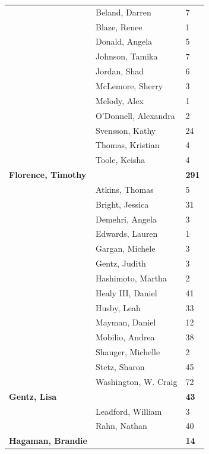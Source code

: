 \documentclass{article}\usepackage[]{graphicx}\usepackage[]{color}
\begin{document}
{\begin{longtable} { >{\raggedright}p{}|p{}p{}}
   & Beland, Darren & 7 \\ 
   & Blaze, Renee & 1 \\ 
   & Donald, Angela & 5 \\ 
   \rowcolor[gray]{0.90} & Johnson, Tamika & 7 \\ 
   \rowcolor[gray]{0.90} & Jordan, Shad & 6 \\ 
   \rowcolor[gray]{0.90} & McLemore, Sherry & 3 \\ 
   & Melody, Alex & 1 \\ 
   & O'Donnell, Alexandra & 2 \\ 
   & Svensson, Kathy & 24 \\ 
   \rowcolor[gray]{0.90} & Thomas, Kristian & 4 \\ 
   \rowcolor[gray]{0.90} & Toole, Keisha & 4 \\ 
   \rowcolor[gray]{0.90}\textbf{Florence, Timothy} &  & \hspace{2cm}\textbf{291} \\ 
   & Atkins, Thomas & 5 \\ 
   & Bright, Jessica & 31 \\ 
   & Demehri, Angela & 3 \\ 
   \rowcolor[gray]{0.90} & Edwards, Lauren & 1 \\ 
   \rowcolor[gray]{0.90} & Gargan, Michele & 3 \\ 
   \rowcolor[gray]{0.90} & Gentz, Judith & 3 \\ 
   & Hashimoto, Martha & 2 \\ 
   & Healy III, Daniel & 41 \\ 
   & Husby, Leah & 33 \\ 
   \rowcolor[gray]{0.90} & Mayman, Daniel & 12 \\ 
   \rowcolor[gray]{0.90} & Mobilio, Andrea & 38 \\ 
   \rowcolor[gray]{0.90} & Shauger, Michelle & 2 \\ 
   & Stetz, Sharon & 45 \\ 
   & Washington, W. Craig & 72 \\ 
  \textbf{Gentz, Lisa} &  & \hspace{2cm}\textbf{43} \\ 
   \rowcolor[gray]{0.90} & Leadford, William & 3 \\ 
   \rowcolor[gray]{0.90} & Rahn, Nathan & 40 \\ 
   \rowcolor[gray]{0.90}\textbf{Hagaman, Brandie} &  & \hspace{2cm}\textbf{14} \\ 

\end{longtable}}
\end{document}
